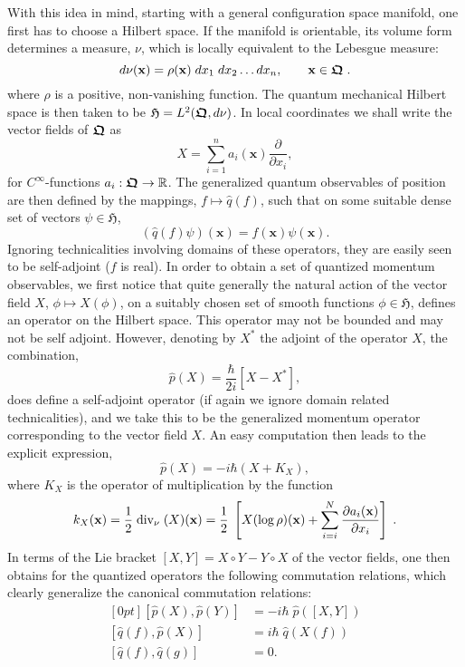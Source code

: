 \documentclass[11pt]{amsart}
\numberwithin{equation}{section}
\theoremstyle{remark}
\newcommand\HH{\mathfrak H}
\newcommand{\be}{\begin{equation}}
\newcommand{\en}{\end{equation}}
\newcommand{\bfrakQ}{\mbox{\boldmath $\mathfrak Q$}}
\newcommand{\bx}{\mathbf x}
\begin{document}
With this idea in mind, starting with a general configuration space manifold,
one first has to choose a Hilbert space. If the manifold is orientable, its
volume form determines a measure, $\nu$, which is locally equivalent to the
Lebesgue measure:
\be
   d\nu (\bx) = \rho (\bx)\; dx_1\;dx_2 \ldots dx_n ,
 \qquad \bx \in \bfrakQ \; . \label{volmeas}
\en
where $\rho$ is a positive, non-vanishing function. The quantum mechanical
Hilbert space is then taken to be $\HH = L^2 (\bfrakQ , d\nu )$.
In local coordinates we shall write the vector fields of $\bfrakQ$ as
$$ X = \sum_{i=1}^{n}a_i(\bx)\frac {\partial}{\partial x_i},   $$
for $C^{\infty}$-functions $a_i: \bfrakQ \rightarrow {\mathbb R}$.
The generalized quantum observables of position
are then defined by the mappings, $f \mapsto \widehat{q}(f)$,
such that on some  suitable dense set of vectors $\psi \in \HH$,
\be
     (\widehat{q}(f)\psi )(\bx) = f(\bx)\psi (\bx).
\label{quposops}
\en
Ignoring technicalities involving domains of these operators, they are easily
seen to be self-adjoint ($f$ is real). In order to obtain a set of quantized
momentum observables, we first notice that quite generally the natural action
of the vector field $X$, $\phi \mapsto X(\phi)$, on a suitably chosen set of
smooth functions $\phi \in \HH$, defines an operator on the Hilbert space. This
operator may not be bounded and may not be self adjoint. However, denoting by
$X^*$ the adjoint of the operator $X$, the combination,
\be
   \widehat{p}(X) = \frac \hbar{2i}[X - X^*],
\label{qumomops}
\en
does define a self-adjoint operator (if again we ignore domain related
technicalities), and we take this to be the generalized momentum operator
corresponding to the vector field $X$. An easy computation then leads to the
explicit expression,
\be
      \widehat{p}(X) = -i\hbar (X + K_{X}),
\label{segalquant1}
\en
where $K_X$ is the operator of multiplication by the function
\be
 k_X (\bx) = \frac 12\;\mbox{\rm div}_{\nu}\;(X)(\bx)
= \frac 12\;\left[X(\log \rho )(\bx) +
      \sum_{i=i}^N \frac {\partial a_i (\bx)}{\partial x_i}\right]\;.
  \label{segalquant2}
\en
In terms of the Lie bracket $[X,Y] = X\circ Y - Y\circ X$ of
the vector fields, one then obtains for the quantized operators the following
commutation relations, which clearly generalize the canonical commutation
relations:
\be \begin{aligned}[0pt]
[\widehat{p}(X), \widehat{p}(Y)]  &=  -i\hbar\; \widehat{p}([X,Y]) \\
[\widehat{q}(f), \widehat{p}(X)]  &=  i\hbar\; \widehat{q}(X(f)) \\
    [\widehat{q}(f), \widehat{q}(g)] &= 0.
\end{aligned}  \label{segalquant3} \en
\end{document}
